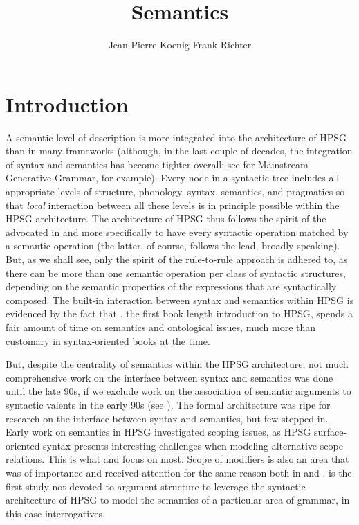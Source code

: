 \documentclass[output=paper]{langsci/langscibook}
\author{%
	Jean-Pierre Koenig\affiliation{University at Buffalo}%
	\lastand Frank Richter\affiliation{Goethe Universität Frankfurt}%
}
\title{Semantics}
\begin{document}
\label{chap-semantics}

\section{Introduction} 

A semantic level of description is more integrated into the architecture of HPSG than in many frameworks  (although, in the last couple of decades, the integration of syntax and semantics has become tighter overall; see \citet{HeimandKratzer1998} for Mainstream Generative Grammar, for example). Every node in a syntactic tree includes  all appropriate levels of structure, phonology, syntax, semantics, and pragmatics so that \emph{local} interaction between all these levels is in principle possible within the HPSG architecture. The architecture of HPSG thus follows the spirit of the  advocated in \citet{Bach1976} and more specifically \citet{KleinandSag1985} to have every syntactic operation matched by a semantic operation (the latter, of course, follows the  lead, broadly speaking). But, as we shall see, only the spirit of the rule-to-rule approach is adhered to, as there can be more than one semantic operation per class of syntactic structures, depending on the semantic properties of the expressions that are syntactically composed. The built-in interaction between syntax and semantics within HPSG is evidenced by the fact that \citet{PollardandSag1987}, the first book length introduction to HPSG, spends a fair amount of time on semantics and ontological issues, much more than customary in syntax-oriented books at the time.

But, despite the centrality of semantics within the HPSG architecture, not much comprehensive work on the interface between syntax and semantics was done  until the late 90s, if we exclude work on the association of semantic arguments to syntactic valents in the early 90s (see ). The formal architecture was ripe for research on the interface between syntax and semantics, but few stepped in. Early work on semantics in HPSG investigated scoping issues, as HPSG surface-oriented syntax presents interesting challenges when modeling alternative scope relations. This is what \citet{PollardandSag1987} and \citet{PollardandSag1994} focus on most. Scope of modifiers is also an area that was of importance and received attention for the same reason both in \citet{PollardandSag1994} and \citet{Kasper1997}. \cite{GinzburgandSag2001} is the first study not devoted to argument structure to leverage the syntactic architecture of HPSG to model the semantics of a particular area of grammar, in this case interrogatives. 
\end{document}

